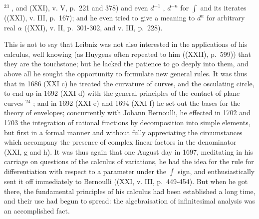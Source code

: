 \({}^{23}\) , and (XXI), v. V, p.~221 and 378) and even \(d^{-1}\) , \(d^{-n}\) for \(\int\) and its iterates ((XXI), v. III, p.~167); and he even tried to give a meaning to \(d^{\alpha}\) for arbitrary real \(\alpha\) ((XXI), v. II, p.~301-302, and v. III, p.~228).

This is not to say that Leibniz was not also interested in the applications of his calculus, well knowing (as Huygens often repeated to him ((XXII), p.~599)) that they are the touchstone; but he lacked the patience to go deeply into them, and above all he sought the opportunity to formulate new general rules. It was thus that in 1686 (XXI c) he treated the curvature of curves, and the osculating circle, to end up in 1692 (XXI d) with the general principles of the contact of plane curves \({}^{24}\) ; and in 1692 (XXI e) and 1694 (XXI f) he set out the bases for the theory of envelopes; concurrently with Johann Bernoulli, he effected in 1702 and 1703 the integration of rational fractions by decomposition into simple elements, but first in a formal manner and without fully appreciating the circumstances which accompany the presence of complex linear factors in the denominator (XXI, g and h). It was thus again that one August day in 1697, meditating in his carriage on questions of the calculus of variations, he had the idea for the rule for differentiation with respect to a parameter under the \(\int\) sign, and enthusiastically sent it off immediately to Bernoulli ((XXI, v. III, p.~449-454). But when he got there, the fundamental principles of his calculus had been established a long time, and their use had begun to spread: the algebraisation of infinitesimal analysis was an accomplished fact.

